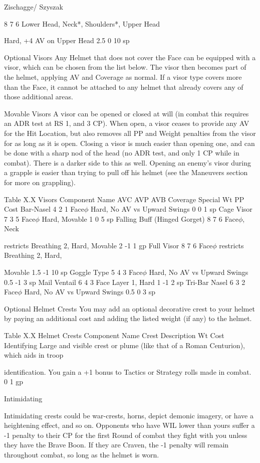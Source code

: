 \documentclass[oneside,11pt,english]{book}
\begin{document}
Zischagge/ Szyszak

8 7 6 Lower Head, Neck*, 
Shoulders*, Upper Head

Hard, +4 AV on Upper 
Head 2.5 0 10 sp

Optional Visors
Any Helmet that does not cover the Face can be equipped with a visor, which can be chosen from the list below. The 
visor then becomes part of the helmet, applying AV and Coverage as normal. If a visor type covers more than the 
Face, it cannot be attached to any helmet that already covers any of those additional areas.

Movable Visors
A visor can be opened or closed at will (in combat this requires an ADR test at RS 1, and 3 CP). When open, a visor 
ceases to provide any AV for the Hit Location, but also removes all PP and Weight penalties from the visor for as long 
as it is open. Closing a visor is much easier than opening one, and can be done with a sharp nod of the head (no ADR 
test, and only 1 CP while in combat). There is a darker side to this as well. Opening an enemy’s visor during a grapple 
is easier than trying to pull off his helmet (see the Maneuvers section for more on grappling).

Table X.X Visors
Component Name AVC AVP AVB Coverage Special Wt PP Cost
Bar-Nasel 4 2 1 Face$\phi$ Hard, No AV vs Upward Swings 0 0 1 sp
Cage Visor 7 3 5 Face$\phi$ Hard, Movable 1 0 5 sp
Falling Buff 
(Hinged Gorget) 8 7 6 Face$\phi$, Neck

restricts Breathing 2, Hard, 
Movable 2 -1 1 gp
Full Visor 8 7 6 Face$\phi$ restricts Breathing 2, Hard, 

Movable 1.5 -1 10 sp
Goggle Type 5 4 3 Face$\phi$ Hard, No AV vs Upward Swings 0.5 -1 3 sp
Mail Ventail 6 4 3 Face Layer 1, Hard 1 -1 2 sp
Tri-Bar Nasel 6 3 2 Face$\phi$ Hard, No AV vs Upward Swings 0.5 0 3 sp


Optional Helmet Crests
You may add an optional decorative crest to your helmet by paying an additional cost and adding the listed weight (if 
any) to the helmet.

Table X.X Helmet Crests
Component Name Crest Description Wt Cost
Identifying Large and visible crest or plume (like that of a Roman Centurion), which aids in troop 

identification. You gain a +1 bonus to Tactics or Strategy rolls made in combat. 0 1 gp

Intimidating

Intimidating crests could be war-crests, horns, depict demonic imagery, or have a 
heightening effect, and so on. Opponents who have WIL lower than yours suffer a -1 
penalty to their CP for the first Round of combat they fight with you unless they have 
the Brave Boon. If they are Craven, the -1 penalty will remain throughout combat, so 
long as the helmet is worn.
\end{document}
